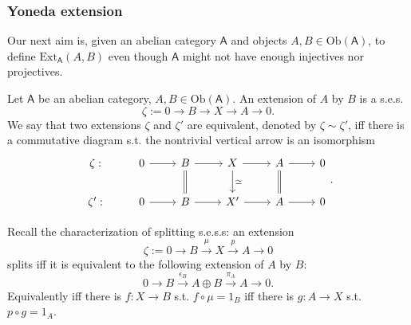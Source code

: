 \subsubsection{Yoneda extension}
Our next aim is, given an abelian category $\mathsf{A}$ and objects $A,B \in \mathrm{Ob} \left(\mathsf{A}\right)$,
to define $\mathrm{Ext}^{ }_{ \mathsf{A}} \left( A, B \right)$ even though
$\mathsf{A}$ might not have enough injectives nor projectives.
\begin{defn}[Extension]
	Let $\mathsf{A}$ be an abelian category, $A,B \in \mathrm{Ob} \left(\mathsf{A}\right)$.
	An extension of $A$ by $B$ is a s.e.s.
	\begin{equation}
		\zeta := 0 \to B \to  X \to A \to 0
	.\end{equation} 
	We say that two extensions $\zeta$ and $\zeta'$ are equivalent, denoted by $\zeta \sim \zeta'$,
	iff there is a commutative diagram s.t. the nontrivial vertical arrow is an isomorphism
	\begin{equation}
	\begin{tikzcd}
		\zeta : &
		0 \arrow[r, "", rightarrow] &
		B \arrow[r, "", rightarrow] \arrow[d, "", equal] &
		X \arrow[r, "", rightarrow] \arrow[d, "\simeq", rightarrow] &
		A \arrow[r, "", rightarrow] \arrow[d, "", equal] &
		0\\
		\zeta' : &
		0 \arrow[r, "", rightarrow] &
		B \arrow[r, "", rightarrow] &
		X' \arrow[r, "", rightarrow] &
		A \arrow[r, "", rightarrow] &
		0
	\end{tikzcd}
	.\end{equation} 
\end{defn}
\begin{rem}
	Recall the characterization of splitting s.e.s.s: an extension
	\begin{equation}
	\zeta := 0 \to B \xrightarrow{\mu} X \xrightarrow{p} A \to 0
	\end{equation} 
	splits iff it is equivalent to the following extension of $A$ by $B$:
	\begin{equation}
	0 \to B \xrightarrow{\epsilon_B} A \oplus B \xrightarrow{\pi_A} A \to 0
	.\end{equation} 
	Equivalently iff there is $f: X \to B$ s.t. $f \circ \mu = 1_B$
	iff there is $g: A \to X$ s.t. $p \circ g = 1_A$.
\end{rem}

